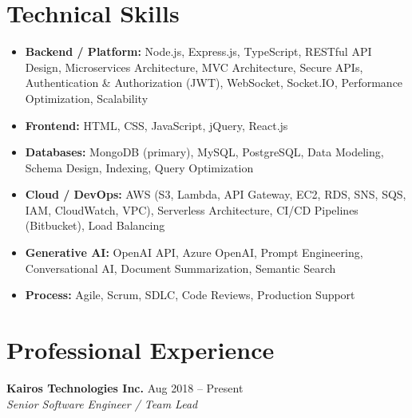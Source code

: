 \documentclass[a4paper,10pt]{article}
\begin{document}
\section*{Technical Skills}
\begin{itemize}[leftmargin=*,itemsep=0.2em]
    \item \textbf{Backend / Platform:} Node.js, Express.js, TypeScript, RESTful API Design, Microservices Architecture, MVC Architecture, Secure APIs, Authentication \& Authorization (JWT), WebSocket, Socket.IO, Performance Optimization, Scalability
    \item \textbf{Frontend:} HTML, CSS, JavaScript, jQuery, React.js
    \item \textbf{Databases:} MongoDB (primary), MySQL, PostgreSQL, Data Modeling, Schema Design, Indexing, Query Optimization
    \item \textbf{Cloud / DevOps:} AWS (S3, Lambda, API Gateway, EC2, RDS, SNS, SQS, IAM, CloudWatch, VPC), Serverless Architecture, CI/CD Pipelines (Bitbucket), Load Balancing
    \item \textbf{Generative AI:} OpenAI API, Azure OpenAI, Prompt Engineering, Conversational AI, Document Summarization, Semantic Search
    \item \textbf{Process:} Agile, Scrum, SDLC, Code Reviews, Production Support
\end{itemize}

\vspace{-2mm}
\noindent\makebox[\linewidth]{\rule{\linewidth}{0.4pt}}

\section*{Professional Experience}

\textbf{Kairos Technologies Inc.} \hfill Aug 2018 -- Present \\
\textit{Senior Software Engineer / Team Lead}
\end{document}
